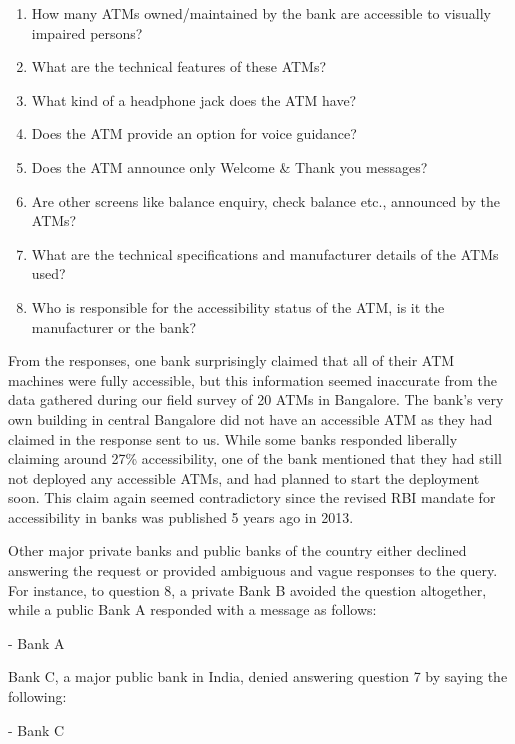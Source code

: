 \begin{enumerate}
    \item How many ATMs owned/maintained by the bank are accessible to visually impaired persons?
    \item What are the technical features of these ATMs?
    \item What kind of a headphone jack does the ATM have?
    \item Does the ATM provide an option for voice guidance?
    \item Does the ATM announce only Welcome \& Thank you messages?
    \item Are other screens like balance enquiry, check balance etc., announced by the ATMs?
    \item What are the technical specifications and manufacturer details of the ATMs used?
    \item Who is responsible for the accessibility status of the ATM, is it the manufacturer or the bank?
\end{enumerate}

From the responses, one bank surprisingly claimed that all of their ATM machines were fully accessible, but this information seemed inaccurate from the data gathered during our field survey of 20 ATMs in Bangalore. The bank's very own building in central Bangalore did not have an accessible ATM as they had claimed in the response sent to us. While some banks responded liberally claiming around 27\% accessibility, one of the bank mentioned that they had still not deployed any accessible ATMs, and had planned to start the deployment soon. This claim again seemed contradictory since the revised RBI mandate for accessibility in banks was published 5 years ago in 2013.  

Other major private banks and public banks of the country either declined answering the request or provided ambiguous and vague responses to the query. For instance, to question 8, a private Bank B avoided the question altogether, while a public Bank A responded with a message as follows:

\textcolor{quotegray}{ - Bank A}

Bank C, a major public bank in India, denied answering question 7 by saying the following:

\textcolor{quotegray}{ - Bank C}

